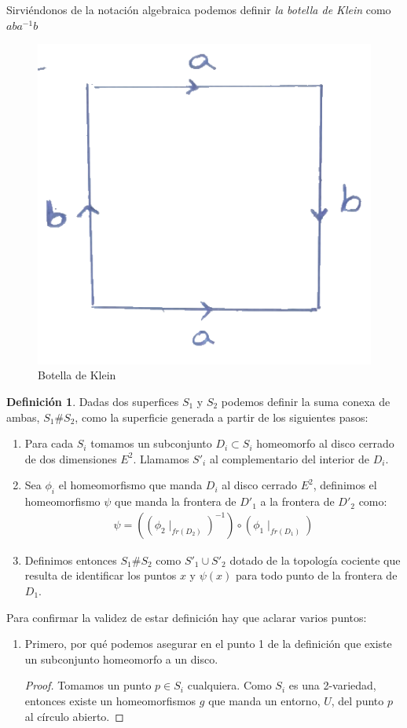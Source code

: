 \documentclass[a4paper,11pt,spanish, twoside, leqno]{tfg-uam}
\theoremstyle{definition}
\newtheorem{defin}[teor]{Definici\'on}
\begin{document}
Sirviéndonos de la notación algebraica podemos definir \textit{la botella de Klein} como $aba^{-1}b$ 


\begin{figure}[h]\label{fig:botelladeklein}
	\centering
	\includegraphics[width=0.3\linewidth]{imagenes/klein.png}
	\caption{Botella de Klein}
\end{figure} 


\begin{defin}\label{defin:sumaconexa}
	Dadas dos superfices $S_1$ y $S_2$ podemos definir la suma conexa de ambas, $S_1\#S_2$, como la superficie generada a partir de los siguientes pasos:
	
	\begin{enumerate}
		\item 
		Para cada $S_i$ tomamos un subconjunto $D_i\subset S_i$ homeomorfo al disco cerrado de dos dimensiones $E^2$. Llamamos $S'_i$ al complementario del interior de $D_i$.
		\item 
		Sea $\phi_i$ el homeomorfismo que manda $D_i$ al disco cerrado $E^2$, definimos el homeomorfismo $\psi$ que manda la frontera de $D'_1$ a la frontera de $D'_2$ como:
		\begin{align*}
		\psi = ((\phi_{2}\mid_{fr(D_2)})^{-1}) \circ (\phi_1\mid_{fr(D_1)})
		\end{align*}
		\item 
		Definimos entonces $S_1\#S_2$ como $S'_1\cup S'_2$ dotado de la topología cociente que resulta de identificar los puntos $x$ y $\psi(x)$ para todo punto de la frontera de $D_1$.
	\end{enumerate}
	
	Para confirmar la validez de estar definición hay que aclarar varios puntos:
	\begin{enumerate}
		\item 
		Primero, por qué podemos asegurar en el punto 1 de la definición que existe un subconjunto homeomorfo a un disco.
		\begin{proof}
			Tomamos un punto $p\in S_i$ cualquiera. Como $S_i$ es una 2-variedad, entonces existe un homeomorfismos $g$ que manda un entorno, $U$, del punto $p$ al círculo abierto. 
			

\end{proof}
\end{enumerate}
\end{defin}
\end{document}
